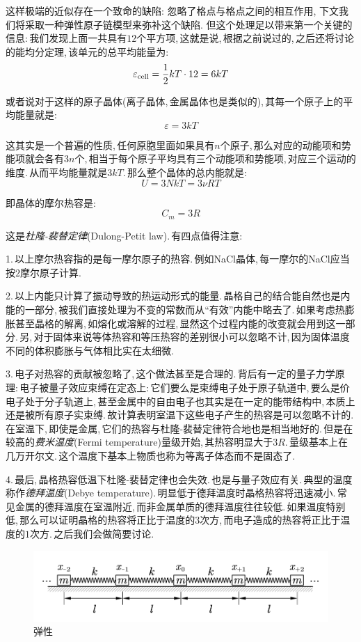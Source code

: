 这样极端的近似存在一个致命的缺陷: 忽略了格点与格点之间的相互作用, 下文我们将采取一种弹性原子链模型来弥补这个缺陷. 但这个处理足以带来第一个关键的信息:\,我们发现上面一共具有$12$个平方项,\,这就是说,\,根据之前说过的,\,之后还将讨论的能均分定理,\,该单元的总平均能量为:
\[\varepsilon_{\rm cell}=\frac{1}{2}kT\cdot 12=6kT\]

或者说对于这样的原子晶体(离子晶体,\,金属晶体也是类似的),\,其每一个原子上的平均能量就是:
\[\varepsilon=3kT\]

这其实是一个普遍的性质,\,任何原胞里面如果具有$n$个原子,\,那么对应的动能项和势能项就会各有$3n$个,\,相当于每个原子平均具有三个动能项和势能项,\,对应三个运动的维度.\,从而平均能量就是$3kT$.\,那么整个晶体的总内能就是:
\[U=3NkT=3\nu RT\]

即晶体的摩尔热容是:
\[C_{m}=3R\]

这是\emph{杜隆-裴替定律}(Dulong-Petit law).\,有四点值得注意:

1.\,以上摩尔热容指的是每一摩尔原子的热容.\,例如NaCl晶体,\,每一摩尔的NaCl应当按$2$摩尔原子计算.

2.\,以上内能只计算了振动导致的热运动形式的能量.\,晶格自己的结合能自然也是内能的一部分,\,被我们直接处理为不变的常数而从``有效''内能中略去了.\,如果考虑热膨胀甚至晶格的解离,\,如熔化或溶解的过程,\,显然这个过程内能的改变就会用到这一部分.\,另,\,对于固体来说等体热容和等压热容的差别很小可以忽略不计,\,因为固体温度不同的体积膨胀与气体相比实在太细微.

3.\,电子对热容的贡献被忽略了,\,这个做法甚至是合理的.\,背后有一定的量子力学原理:\,电子被量子效应束缚在定态上:\,它们要么是束缚电子处于原子轨道中,\,要么是价电子处于分子轨道上,\,甚至金属中的自由电子也其实是在一定的能带结构中,\,本质上还是被所有原子实束缚.\,故计算表明室温下这些电子产生的热容是可以忽略不计的.\,在室温下,\,即使是金属,\,它们的热容与杜隆-裴替定律符合地也是相当地好的.\,但是在较高的\emph{费米温度}(Fermi temperature)量级开始,\,其热容明显大于$3R$.\,量级基本上在几万开尔文.\,这个温度下基本上物质也称为等离子体态而不是固态了.

4.\,最后,\,晶格热容低温下杜隆-裴替定律也会失效.\,也是与量子效应有关.\,典型的温度称作\emph{德拜温度}(Debye temperature).\,明显低于德拜温度时晶格热容将迅速减小.\,常见金属的德拜温度在室温附近,\,而非金属单质的德拜温度往往较低.\,如果温度特别低,\,那么可以证明晶格的热容将正比于温度的$3$次方,\,而电子造成的热容将正比于温度的$1$次方.\,之后我们会做简要讨论.

\begin{figure}[H]
\centering
\includegraphics[width=15cm]{image/5-3-5.png}
\caption{弹性}
\end{figure}

